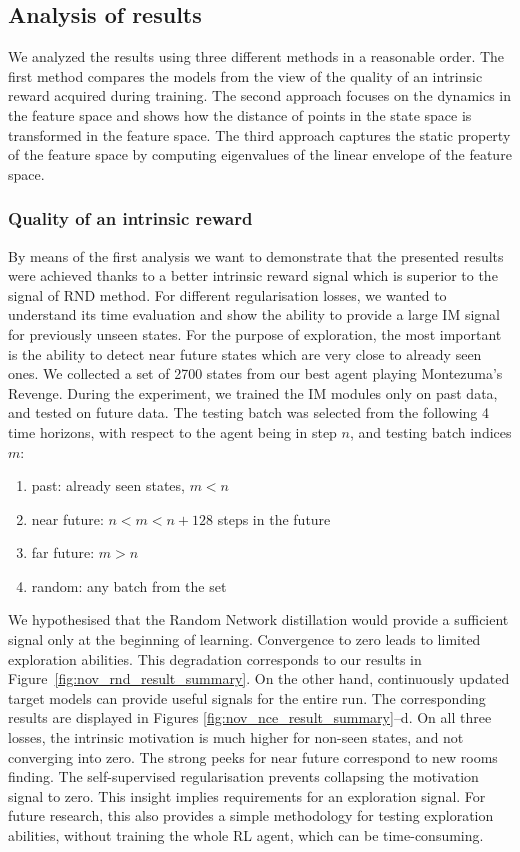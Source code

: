 \documentclass[a4paper,11pt]{elsarticle}
\begin{document}
\subsection{Analysis of results}

We analyzed the results using three different methods in a reasonable order. 
The first method compares the models from the view of the quality of an intrinsic reward acquired during training. The second approach focuses on the dynamics in the feature space and shows how the distance of points in the state space is transformed in the feature space. The third approach captures the static property of the feature space by computing eigenvalues of the linear envelope of the feature space.

\subsubsection{Quality of an intrinsic reward}

By means of the first analysis we want to demonstrate that the presented results were achieved thanks to a better intrinsic reward signal which is superior to the signal of RND method. For different regularisation losses, we wanted to understand its time evaluation and show the ability to provide a large IM signal for previously unseen states. For the purpose of exploration, the most important is the ability to detect near future states which are very close to already seen ones. We collected a set of 2700 states from our best agent playing Montezuma's Revenge. During the experiment, we trained the IM modules only on past data, and tested on future data. The testing batch was selected from the following 4 time horizons, with respect to the agent being in step $n$, and testing batch indices $m$:
\begin{enumerate}
    \item past: already seen states, $m<n$
    \item near future: $n < m < n+128$ steps in the future
    \item far future: $m > n$
    \item random: any batch from the set
\end{enumerate}

We hypothesised that the Random Network distillation would provide a sufficient signal only at the beginning of learning. Convergence to zero leads to limited exploration abilities. This degradation corresponds to our results in Figure~\ref{fig:nov_rnd_result_summary}.
On the other hand, continuously updated target models can provide useful signals for the entire run. The corresponding results are displayed in Figures \ref{fig:nov_nce_result_summary}--d. On all three losses, the intrinsic motivation is much higher for non-seen states, and not converging into zero. The strong peeks for near future correspond to new rooms finding. The self-supervised regularisation prevents collapsing the motivation signal to zero. 
This insight implies  requirements for an exploration signal.
For future research, this also provides a simple methodology for testing exploration abilities, without training the whole RL agent, which can be time-consuming. 
\end{document}
